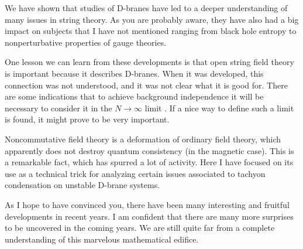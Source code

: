 \documentclass[a4paper,12pt]{article}
\begin{document}
We have shown that studies of D-branes have led to a deeper
understanding of many issues in string theory.  As you are
probably aware, they have also had a big impact on subjects that I
have not mentioned ranging from black hole entropy to
nonperturbative properties of gauge theories.

One lesson we can learn from these developments is that open
string field theory is important because it describes D-branes.
When it was developed, this connection was not understood, and it
was not clear what it is good for. There are some indications that
to achieve background independence it will be necessary to
consider it in the $N\to \infty$ limit \cite{W5}. If a nice way to define
such a limit is found, it might prove to be very important.

Noncommutative field theory is a deformation of ordinary field
theory, which apparently does not destroy quantum consistency (in
the magnetic case). This is a remarkable fact, which has spurred a
lot of activity. Here I have focused on its use as a technical
trick for analyzing certain issues associated to tachyon
condensation on unstable D-brane systems.

As I hope to have convinced you, there have been many interesting
and fruitful developments in recent years. I am confident that
there are many more surprises to be uncovered in the coming years.
We are still quite far from a complete understanding of this
marvelous mathematical edifice.
\end{document}
